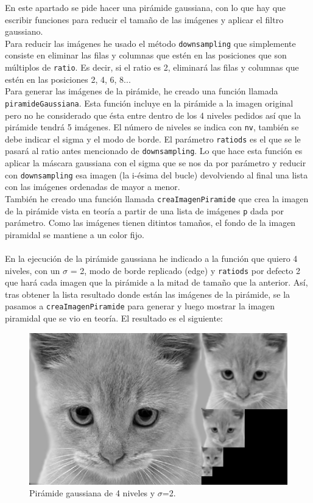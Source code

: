 \documentclass[12pt]{article}
\begin{document}
En este apartado se pide hacer una pirámide gaussiana, con lo que hay que escribir funciones para reducir el tamaño de las imágenes y aplicar el filtro gaussiano.\\
Para reducir las imágenes he usado el método \texttt{downsampling} que simplemente consiste en eliminar las filas y columnas que estén en las posiciones que son múltiplos de \texttt{ratio}. Es decir, si el ratio es 2, eliminará las filas y columnas que estén en las posiciones 2, 4, 6, 8...\\
Para generar las imágenes de la pirámide, he creado una función llamada \texttt{piramideGaussiana}. Esta función incluye en la pirámide a la imagen original pero no he considerado que ésta entre dentro de los 4 niveles pedidos así que la pirámide tendrá 5 imágenes. El número de niveles se indica con \texttt{nv}, también se debe indicar el sigma y el modo de borde. El parámetro \texttt{ratiods} es el que se le pasará al ratio antes mencionado de \texttt{downsampling}. Lo que hace esta función es aplicar la máscara gaussiana con el sigma que se nos da por parámetro y reducir con \texttt{downsampling} esa imagen (la i-ésima del bucle) devolviendo al final una lista con las imágenes ordenadas de mayor a menor.\\
También he creado una función llamada \texttt{creaImagenPiramide} que crea la imagen de la pirámide vista en teoría a partir de una lista de imágenes \texttt{p} dada por parámetro. Como las imágenes tienen ditintos tamaños, el fondo de la imagen piramidal se mantiene a un color fijo.\\\\
En la ejecución de la pirámide gaussiana he indicado a la función que quiero 4 niveles, con un $\sigma$ = 2, modo de borde replicado (edge) y \texttt{ratiods} por defecto 2 que hará cada imagen que la pirámide a la mitad de tamaño que la anterior. Así, tras obtener la lista resultado donde están las imágenes de la pirámide, se la pasamos a \texttt{creaImagenPiramide} para generar y luego mostrar la imagen piramidal que se vio en teoría. El resultado es el siguiente:

\begin{figure}[H]
\centering
\includegraphics[scale=0.55]{images/PiramideGaussianaGato.png} 
\caption{Pirámide gaussiana de 4 niveles y $\sigma$=2.}
\label{etiqueta}
\end{figure}
\end{document}
